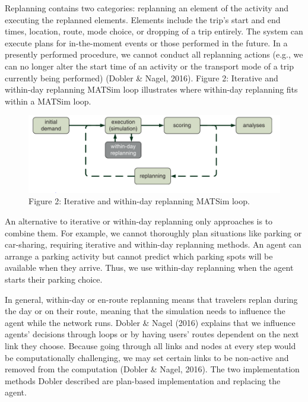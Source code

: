 \documentclass[fancy, oneside, mastersfancy, ms]{byuthesis}
\begin{document}
Replanning contains two categories: replanning an element of the
activity and executing the replanned elements. Elements include the
trip's start and end times, location, route, mode choice, or dropping of
a trip entirely. The system can execute plans for in-the-moment events
or those performed in the future. In a presently performed procedure, we
cannot conduct all replanning actions (e.g., we can no longer alter the
start time of an activity or the transport mode of a trip currently
being performed) (Dobler \& Nagel, 2016). Figure 2: Iterative and
within-day replanning MATSim loop illustrates where within-day
replanning fits within a MATSim loop.

\begin{figure}

{\centering \includegraphics{figures/fig2.png}

}

\caption{Figure 2: Iterative and within-day replanning MATSim loop.}

\end{figure}

An alternative to iterative or within-day replanning only approaches is
to combine them. For example, we cannot thoroughly plan situations like
parking or car-sharing, requiring iterative and within-day replanning
methods. An agent can arrange a parking activity but cannot predict
which parking spots will be available when they arrive. Thus, we use
within-day replanning when the agent starts their parking choice.

In general, within-day or en-route replanning means that travelers
replan during the day or on their route, meaning that the simulation
needs to influence the agent while the network runs. Dobler \& Nagel
(2016) explains that we influence agents' decisions through loops or by
having users' routes dependent on the next link they choose. Because
going through all links and nodes at every step would be computationally
challenging, we may set certain links to be non-active and removed from
the computation (Dobler \& Nagel, 2016). The two implementation methods
Dobler described are plan-based implementation and replacing the agent.
\end{document}

